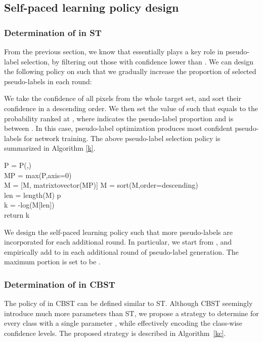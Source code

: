 \documentclass[runningheads]{llncs}
\begin{document}
\subsection{Self-paced learning policy design}
\subsubsection{Determination of  in ST} \label{plg_st_1}
From the previous section, we know that  essentially plays a key role in pseudo-label selection, by filtering out those with confidence lower than . We can design the following policy on  such that we gradually increase the proportion of selected pseudo-labels in each round:

We take the confidence of all pixels from the whole target set, and sort their confidence in a descending order. We then set the value of  such that  equals to the probability ranked at , where  indicates the pseudo-label proportion and is between . In this case, pseudo-label optimization produces  most confident pseudo-labels for network training. The above pseudo-label selection policy is summarized in Algorithm \ref{k}.

\begin{algorithm}

     { P = P(,) \\
        MP = max(P,axis=0) \\
     M = [M, matrixtovector(MP)]
     }
     {
     M = sort(M,order=descending)\\
     len = length(M)  p \\
     k = -log(M[len]) \\
     return k
     }
    \caption{Determination of k in ST}
    \label{k}
\end{algorithm}

We design the self-paced learning policy such that more pseudo-labels are incorporated for each additional round. In particular, we start  from , and empirically add  to  in each additional round of pseudo-label generation. The maximum portion is set to be .

\subsubsection{Determination of  in CBST} \label{plg_cbst_1}
The policy of  in CBST can be defined similar to ST. Although CBST seemingly introduce much more parameters than ST, we propose a strategy to determine  for every class with a single parameter , while effectively encoding the class-wise confidence levels. The proposed strategy is described in Algorithm~\ref{kc}.
\end{document}
